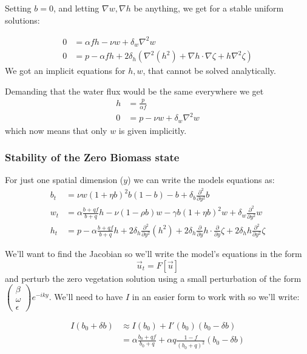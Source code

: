 Setting $b=0$, and letting $\nabla w,\nabla h$ be anything, we get for a stable
uniform solutions:

\begin{align*}
0 & =\alpha f h-\nu w + \delta_w \nabla^2 w\\
0 & =p - \alpha f h +2 \delta_h \left( \nabla^2 (h^2) + \nabla h \cdot \nabla \zeta + h\nabla^2 \zeta \right) 
\end{align*}
We got an implicit equations for $h,w$, that cannot be solved analytically.

Demanding that the water flux would be the same everywhere we get
\begin{align*}
    h &= \frac{p}{\alpha f}\\
    0 &= p-\nu w + \delta_w \nabla^2 w
\end{align*}
which now means that only $w$ is given implicitly.

\subsubsection{Stability of the Zero Biomass state}
For just one spatial dimension ($y$) we can write the models equations
as:
\begin{align*}
b_{t} & =\nu w\left(1+\eta b\right)^{2}b\left(1-b\right)-b+\delta_{b}\frac{\partial^{2}}{\partial y^{2}}b\\
w_{t} & =\alpha\frac{b+qf}{b+q}h-\nu\left(1-\rho b\right)w-\gamma b\left(1+\eta b\right)^{2}w+\delta_{w}\frac{\partial^{2}}{\partial y^{2}}w\\
h_{t} & =p-\alpha\frac{b+qf}{b+q}h+2\delta_{h}\frac{\partial^{2}}{\partial y^{2}}\left(h^{2}\right)+2\delta_{h}\frac{\partial}{\partial y}h\cdot\frac{\partial}{\partial y}\zeta+2\delta_{h}h\frac{\partial^{2}}{\partial y^{2}}\zeta
\end{align*}

We'll want to find the Jacobian so we'll write the model's equations in the form
\[
\Vec{u}_t = F[\Vec{u}]
\]
and perturb the zero vegetation solution using a small perturbation of the form $\left(\begin{array}{c}
\beta\\
\omega\\
\epsilon
\end{array}\right)e^{-iky}$.
We'll need to have $I$ in an easier form to work with so we'll write:

\begin{align*}
    I(b_0 + \delta b) &\approx I(b_0) + I'(b_0) (b_0 - \delta b) \\
    &= \alpha \frac{b_0 + q f}{b_0+q} + \alpha q \frac{1-f}{(b_0+q)^2}(b_0-\delta b)
\end{align*}


